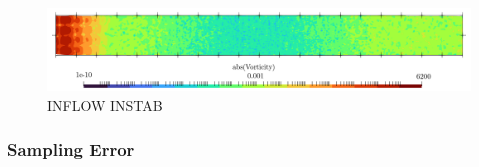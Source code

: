 
\begin{figure}[t]
\centering
\includegraphics[scale=0.36]{assets/graphs/u-inflow-instab.png}
\caption{INFLOW INSTAB}
\label{fig:inflow-instab}
\end{figure}


\subsubsection{Sampling Error}


